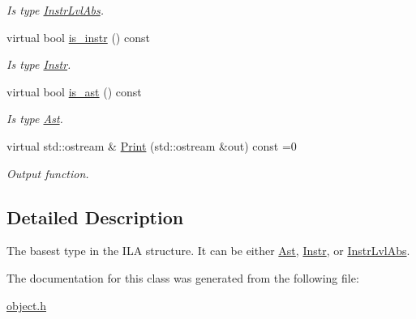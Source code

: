\begin{DoxyCompactItemize}
\begin{DoxyCompactList}\small\item\em Is type \mbox{\hyperlink{classilang_1_1_instr_lvl_abs}{Instr\+Lvl\+Abs}}. \end{DoxyCompactList}\item 
\mbox{\label{classilang_1_1_object_abafa1d9b1ba81835b191fc8a032f13ae}} 
virtual bool \mbox{\hyperlink{classilang_1_1_object_abafa1d9b1ba81835b191fc8a032f13ae}{is\+\_\+instr}} () const
\begin{DoxyCompactList}\small\item\em Is type \mbox{\hyperlink{classilang_1_1_instr}{Instr}}. \end{DoxyCompactList}\item 
\mbox{\label{classilang_1_1_object_a923a6cec7e1bad09507337c8ffb23942}} 
virtual bool \mbox{\hyperlink{classilang_1_1_object_a923a6cec7e1bad09507337c8ffb23942}{is\+\_\+ast}} () const
\begin{DoxyCompactList}\small\item\em Is type \mbox{\hyperlink{classilang_1_1_ast}{Ast}}. \end{DoxyCompactList}\item 
\mbox{\label{classilang_1_1_object_adbe3fc31434382a559e5337535f1edde}} 
virtual std\+::ostream \& \mbox{\hyperlink{classilang_1_1_object_adbe3fc31434382a559e5337535f1edde}{Print}} (std\+::ostream \&out) const =0
\begin{DoxyCompactList}\small\item\em Output function. \end{DoxyCompactList}\end{DoxyCompactItemize}


\subsection{Detailed Description}
The basest type in the I\+LA structure. It can be either \mbox{\hyperlink{classilang_1_1_ast}{Ast}}, \mbox{\hyperlink{classilang_1_1_instr}{Instr}}, or \mbox{\hyperlink{classilang_1_1_instr_lvl_abs}{Instr\+Lvl\+Abs}}. 

The documentation for this class was generated from the following file\+:\begin{DoxyCompactItemize}
\item 
\mbox{\hyperlink{object_8h}{object.\+h}}\end{DoxyCompactItemize}
